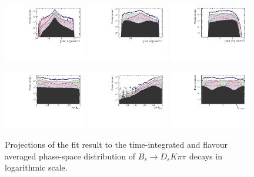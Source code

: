 \begin{figure}[h]
		\includegraphics[width=0.32\textwidth, height = !]{figs/lassoFit/LASSO/m_Kpi_mod_log.pdf} 
		\includegraphics[width=0.32\textwidth, height = !]{figs/lassoFit/LASSO/m_pipi_mod_log.pdf} 
		\includegraphics[width=0.32\textwidth, height = !]{figs/lassoFit/LASSO/m_Dspi_mod_log.pdf} 
		
		\includegraphics[width=0.32\textwidth, height = !]{figs/lassoFit/LASSO/h_cosTheta_Kpi_mod_log.pdf} 
		\includegraphics[width=0.32\textwidth, height = !]{figs/lassoFit/LASSO/h_cosTheta_Dspi_mod_log.pdf} 
		\includegraphics[width=0.32\textwidth, height = !]{figs/lassoFit/LASSO/h_phi_Kpi_Dspi_mod_log.pdf} 

		\caption{\small Projections of the fit result to the time-integrated and flavour averaged phase-space distribution of $B_s \to D_s K \pi \pi$  decays in logarithmic scale.} 		
		\label{fig:lassoFit2}
\end{figure}

